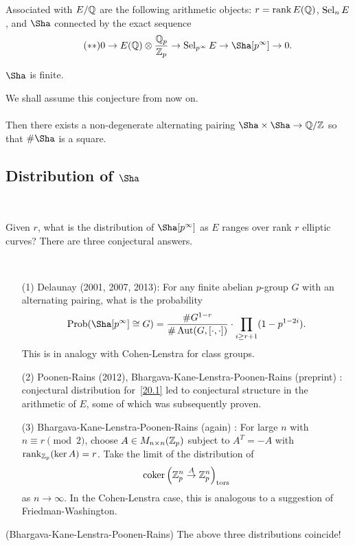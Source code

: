 \documentclass[12pt,amsfont]{amsart}
\begin{document}
Associated with $E/{\mathbb Q}$ are the following arithmetic objects: $r = \operatorname{rank} E({\mathbb Q})$, $\operatorname{Sel}_n E$, and $\Sha$ connected by the exact sequence
\begin{equation}\label{20.1}\tag{$\ast\ast$}
0 \rightarrow E(\bQ) \otimes \frac{\bQ_p}{\bZ_p} \rightarrow \Sel_{p^\infty} E \rightarrow \Sha[p^\infty] \rightarrow 0. 
\end{equation}

\begin{cnj} $\Sha$ is finite. 
\end{cnj}

We shall assume this conjecture from now on. \\ \\
Then there exists a non-degenerate alternating pairing $\Sha \times \Sha \rightarrow \bQ/\bZ$ so that $\#\Sha$ is a square. 

\subsection{Distribution of $\Sha$}
{\ }

Given $r$, what is the distribution of $\Sha[p^\infty]$ as $E$ ranges over rank $r$ elliptic curves? There are three conjectural answers.

{\ }
\begin{enumerate}
\item[(1)]
Delaunay (2001, 2007, 2013): For any finite abelian $p$-group $G$ with an alternating pairing, what is the probability
\[ \operatorname{Prob}(\Sha[p^\infty] \cong G) = \frac{\# G^{1-r}}{\# \Aut(G, [\cdot, \cdot])} \cdot \prod_{i \geq r+1} (1 - p^{1 - 2i}).\]
This is in analogy with Cohen-Lenstra for class groups. 
\item[(2)]
Poonen-Rains (2012), Bhargava-Kane-Lenstra-Poonen-Rains (preprint) : conjectural distribution for~\eqref{20.1} led to conjectural structure in the arithmetic of $E$, some of which was subsequently proven. 
\item[(3)]
Bhargava-Kane-Lenstra-Poonen-Rains (again) : For large $n$ with $n \equiv r \pmod{2}$, choose $A \in M_{n\times n}({\mathbb Z}_p)$ subject to $A^T = -A$ with $\operatorname{rank}_{{\mathbb Z}_p} (\ker A) = r$. Take the limit of the distribution of
\[ \operatorname{coker} \left({\mathbb Z}_p^n \overset{A}{\rightarrow} {\mathbb Z}_p^n\right)_{\text{tors}} \]
as $n \rightarrow \infty$. In the Cohen-Lenstra case, this is analogous to a suggestion of Friedman-Washington. 
\end{enumerate}

\begin{thm} (Bhargava-Kane-Lenstra-Poonen-Rains) The above three distributions coincide!
\end{thm}
\end{document}
